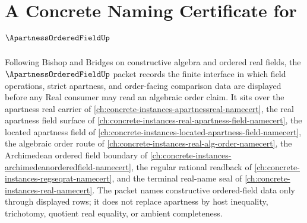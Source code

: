 \chapter{A Concrete Naming Certificate for $\ApartnessOrderedFieldUp$}
\label{ch:concrete-instances-apartness-ordered-field-namecert}

Following Bishop and Bridges on constructive algebra and ordered real fields, the $\ApartnessOrderedFieldUp$ packet records the finite interface in which field operations, strict apartness, and order-facing comparison data are displayed before any Real consumer may read an algebraic order claim. It sits over the apartness real carrier of \autoref{ch:concrete-instances-apartnessreal-namecert}, the real apartness field surface of \autoref{ch:concrete-instances-real-apartness-field-namecert}, the located apartness field of \autoref{ch:concrete-instances-located-apartness-field-namecert}, the algebraic order route of \autoref{ch:concrete-instances-real-alg-order-namecert}, the Archimedean ordered field boundary of \autoref{ch:concrete-instances-archimedeanorderedfield-namecert}, the regular rational readback of \autoref{ch:concrete-instances-regseqrat-namecert}, and the terminal real-name seal of \autoref{ch:concrete-instances-real-namecert}. The packet names constructive ordered-field data only through displayed rows; it does not replace apartness by host inequality, trichotomy, quotient real equality, or ambient completeness.

